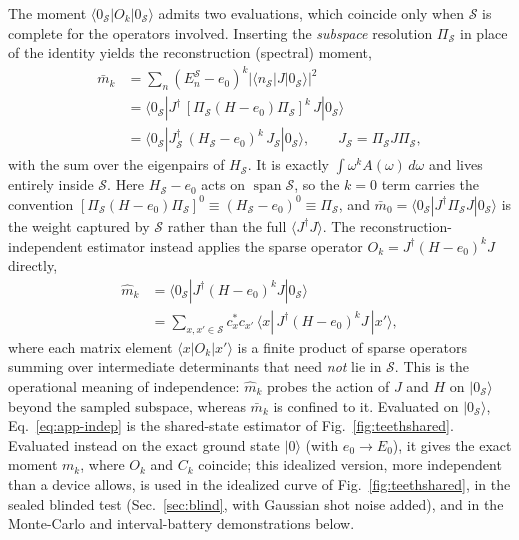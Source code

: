 \documentclass[submission, PhysCore]{SciPost}
\begin{document}
\begin{appendix}
The moment $\langle 0_\mathcal{S}|O_k|0_\mathcal{S}\rangle$ admits two evaluations, which coincide only when $\mathcal{S}$ is complete for the operators involved. Inserting the \emph{subspace} resolution $\Pi_\mathcal{S}$ in place of the identity yields the reconstruction (spectral) moment,
\begin{equation}
\begin{aligned}
\bar m_k&=\sum_{n}(E_n^{\mathcal{S}}-e_0)^k|\langle n_{\mathcal{S}}|J|0_\mathcal{S}\rangle|^2\\
&=\langle 0_\mathcal{S}|J^\dagger\,[\Pi_\mathcal{S}(H-e_0)\Pi_\mathcal{S}]^{k}\,J|0_\mathcal{S}\rangle\\
&=\langle 0_\mathcal{S}|J_\mathcal{S}^\dagger\,(H_\mathcal{S}-e_0)^{k}\,J_\mathcal{S}|0_\mathcal{S}\rangle,\qquad J_\mathcal{S}=\Pi_\mathcal{S}J\Pi_\mathcal{S},
\end{aligned}
\label{eq:app-recon}
\end{equation}
with the sum over the eigenpairs of $H_\mathcal{S}$. It is exactly $\int\omega^k A(\omega)\,d\omega$ and lives entirely inside $\mathcal{S}$. Here $H_\mathcal{S}-e_0$ acts on $\operatorname{span}\mathcal{S}$, so the $k=0$ term carries the convention $[\Pi_\mathcal{S}(H-e_0)\Pi_\mathcal{S}]^{0}\equiv(H_\mathcal{S}-e_0)^0\equiv\Pi_\mathcal{S}$, and ${\bar m_0=\langle 0_\mathcal{S}|J^\dagger\Pi_\mathcal{S}J|0_\mathcal{S}\rangle}$ is the weight captured by $\mathcal{S}$ rather than the full $\langle J^\dagger J\rangle$. The reconstruction-independent estimator instead applies the sparse operator $O_k=J^\dagger(H-e_0)^kJ$ directly,
\begin{equation}
\begin{aligned}
\widehat{m}_k&=\langle 0_\mathcal{S}|J^\dagger(H-e_0)^kJ|0_\mathcal{S}\rangle\\
&=\sum_{x,x'\in\mathcal{S}}c_x^{*}c_{x'}\,\langle x|\,J^\dagger(H-e_0)^kJ\,|x'\rangle,
\end{aligned}
\label{eq:app-indep}
\end{equation}
where each matrix element $\langle x|O_k|x'\rangle$ is a finite product of sparse operators summing over intermediate determinants that need \emph{not} lie in $\mathcal{S}$. This is the operational meaning of independence: $\widehat{m}_k$ probes the action of $J$ and $H$ on $|0_\mathcal{S}\rangle$ beyond the sampled subspace, whereas $\bar m_k$ is confined to it. Evaluated on $|0_\mathcal{S}\rangle$, Eq.~\eqref{eq:app-indep} is the shared-state estimator of Fig.~\ref{fig:teethshared}. Evaluated instead on the exact ground state $|0\rangle$ (with $e_0\to E_0$), it gives the exact moment $m_k$, where $O_k$ and $C_k$ coincide; this idealized version, more independent than a device allows, is used in the idealized curve of Fig.~\ref{fig:teethshared}, in the sealed blinded test (Sec.~\ref{sec:blind}, with Gaussian shot noise added), and in the Monte-Carlo and interval-battery demonstrations below.



\end{appendix}
\end{document}
